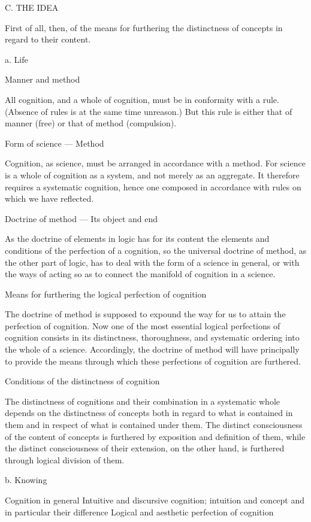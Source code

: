 C. THE IDEA

First of all, then, of the means for furthering
the distinctness of concepts in regard to their content.

a. Life

Manner and method

All cognition, and a whole of cognition,
must be in conformity with a rule.
(Absence of rules is at the same time unreason.)
But this rule is either that of manner (free)
or that of method (compulsion).

Form of science — Method

Cognition, as science, must be arranged
in accordance with a method.
For science is a whole of cognition as a system,
and not merely as an aggregate.
It therefore requires a systematic cognition,
hence one composed in accordance with rules
on which we have reflected.

Doctrine of method — Its object and end

As the doctrine of elements in logic has for its content
the elements and conditions of the perfection of a cognition,
so the universal doctrine of method, as the other part of logic,
has to deal with the form of a science in general,
or with the ways of acting so as to connect
the manifold of cognition in a science.

Means for furthering the logical perfection of cognition

The doctrine of method is supposed to expound the way
for us to attain the perfection of cognition.
Now one of the most essential logical perfections of cognition
consists in its distinctness, thoroughness, and systematic ordering
into the whole of a science.
Accordingly, the doctrine of method will have principally to provide
the means through which these perfections of cognition are furthered.

Conditions of the distinctness of cognition

The distinctness of cognitions and their combination
in a systematic whole depends on the distinctness of concepts
both in regard to what is contained in them
and in respect of what is contained under them.
The distinct consciousness of
the content of concepts is furthered
by exposition and definition of them,
while the distinct consciousness of
their extension, on the other hand,
is furthered through logical division of them.

b. Knowing

Cognition in general
    Intuitive and discursive cognition;
        intuition and concept
        and in particular their difference
    Logical and aesthetic perfection of cognition

